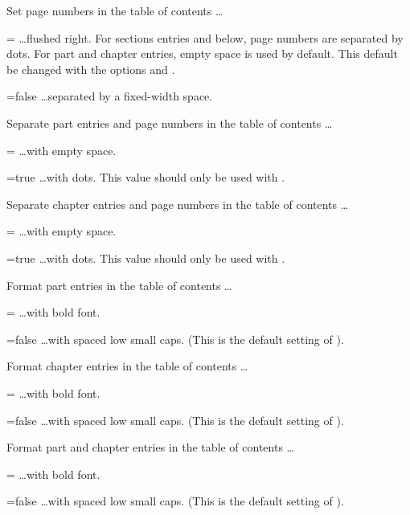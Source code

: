 \begin{optionlist}
   \opt[dottedtoc] Set page numbers in the table of contents \dots
   \begin{valuelist}
      \item[=\optionvaluedefaultfont{true}] \dots flushed right. For sections entries and below, page numbers are separated by dots. For part and chapter entries, empty space is used by default. This default be changed with the options  and .
      \item[=false] \dots separated by a fixed-width space.
   \end{valuelist}
   
   \opt[dottedtocparts] Separate part entries and page numbers in the table of contents \dots
   \begin{valuelist}
      \item[=\optionvaluedefaultfont{false}] \dots with empty space.
      \item[=true] \dots with dots. This value should only be used with .
   \end{valuelist}
   
   \opt[dottedtocchapters] Separate chapter entries and page numbers in the table of contents \dots
   \begin{valuelist}
      \item[=\optionvaluedefaultfont{false}] \dots with empty space.
      \item[=true] \dots with dots. This value should only be used with .
   \end{valuelist}
   
   \opt[tocpartentriesbold] Format part entries in the table of contents \dots
   \begin{valuelist}
      \item[=\optionvaluedefaultfont{true}] \dots with bold font.
      \item[=false] \dots with spaced low small caps. (This is the default setting of ). 
   \end{valuelist}
   
   \opt[tocchapterentriesbold] Format chapter entries in the table of contents \dots
   \begin{valuelist}
      \item[=\optionvaluedefaultfont{true}] \dots with bold font.
      \item[=false] \dots with spaced low small caps. (This is the default setting of ). 
   \end{valuelist}
   
   \opt[tocentriesbold] Format part and chapter entries in the table of contents \dots
   \begin{valuelist}
      \item[=\optionvaluedefaultfont{true}] \dots with bold font.
      \item[=false] \dots with spaced low small caps. (This is the default setting of ). 
   \end{valuelist}
\end{optionlist}

